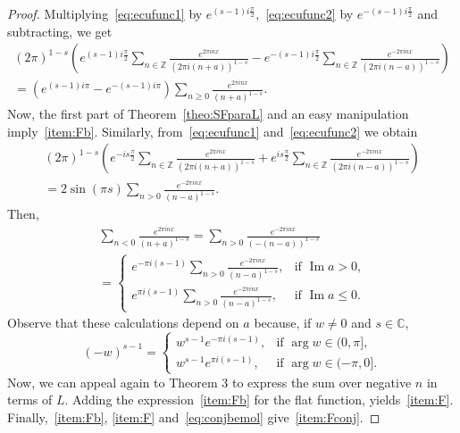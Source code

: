\documentclass[11pt,a4paper,reqno]{amsart}
\newcommand{\C}{\mathbb{C}}
\newcommand{\Z}{\mathbb{Z}}
\renewcommand{\Im}{\operatorname{Im}}
\theoremstyle{plain}
\theoremstyle{remark}
\numberwithin{equation}{section}
\begin{document}
\begin{proof}
Multiplying~\eqref{eq:ecufunc1} by $e^{(s-1)i\frac{\pi}{2}}$,~\eqref{eq:ecufunc2} by $e^{-(s-1)i\frac{\pi}{2}}$ and subtracting, we get
\begin{multline*}
  (2\pi)^{1-s} \left(e^{(s-1)i\frac{\pi}{2}}
  \sum_{n\in\Z}\frac{e^{2\pi inx}}{(2\pi i(n+a))^{1-s}}
  - e^{-(s-1)i\frac{\pi}{2}} \sum_{n\in\Z}\frac{e^{-2\pi inx}}{(2\pi i(n-a))^{1-s}}\right)
  \\
  = \left(e^{(s-1)i\pi}-e^{-(s-1)i\pi}\right) \sum_{n\geq 0} \frac{e^{2\pi inx}}{(n+a)^{1-s}}.
\end{multline*}
Now, the first part of Theorem~\ref{theo:SFparaL} and an easy manipulation imply~\ref{item:Fb}. Similarly, from~\eqref{eq:ecufunc1} and~\eqref{eq:ecufunc2} we obtain
\begin{multline*}
  (2\pi)^{1-s} \left(e^{-is\frac{\pi}{2}}
  \sum_{n\in\Z}\frac{e^{2\pi inx}}{(2\pi i(n+a))^{1-s}}
  + e^{is\frac{\pi}{2}} \sum_{n\in\Z} \frac{e^{-2\pi inx}}{(2\pi i(n-a))^{1-s}}\right)
  \\
  = 2\sin(\pi s) \sum_{n> 0} \frac{e^{-2\pi inx}}{(n-a)^{1-s}}.
\end{multline*}
Then,
\begin{multline*}
  \sum_{n< 0} \frac{e^{2\pi inx}}{(n+a)^{1-s}} = \sum_{n> 0} \frac{e^{-2\pi inx}}{(-(n-a))^{1-s}}
  \\ =
  \begin{cases}
    e^{-\pi i(s-1)}\sum_{n> 0}\frac{e^{-2\pi inx}}{(n-a)^{1-s}}, & \text{if $\Im a>0$,} \\
    e^{\pi i(s-1)}\sum_{n> 0}\frac{e^{-2\pi inx}}{(n-a)^{1-s}}, & \text{if $\Im a\leq 0$.}
  \end{cases}
\end{multline*}
Observe that these calculations depend on $a$ because, if $w\not=0$ and $s\in\C$,
\begin{equation*}
  (-w)^{s-1} =
  \begin{cases}
    w^{s-1}e^{-\pi i(s-1)}, & \text{if $\arg w\in(0,\pi]$,} \\
   w^{s-1}e^{\pi i(s-1)}, & \text{if $\arg w\in(-\pi,0]$.}
  \end{cases}
\end{equation*}
Now, we can appeal again to Theorem 3 to express the sum over negative $n$ in terms of $L$. Adding the expression~\ref{item:Fb} for the flat function, yields~\ref{item:F}. Finally,~\ref{item:Fb}, \ref{item:F} and~\eqref{eq:conjbemol} give~\ref{item:Fconj}.
\end{proof}
\end{document}
